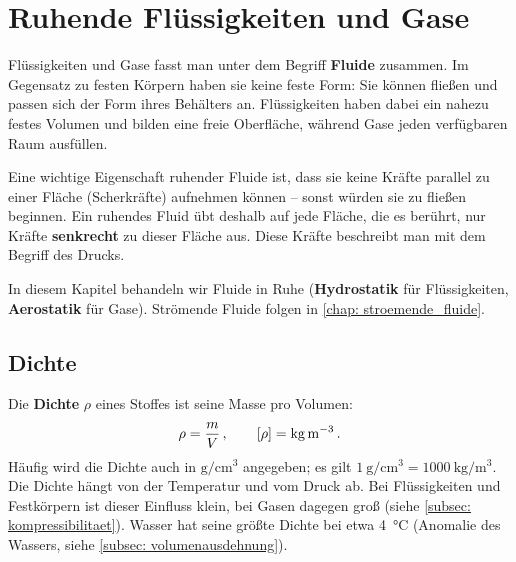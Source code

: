 \chapter{Ruhende Flüssigkeiten und Gase}\label{chap: ruhende_fluide}
Flüssigkeiten und Gase fasst man unter dem Begriff \textbf{Fluide} zusammen. Im Gegensatz zu festen Körpern haben sie keine feste Form: Sie können fließen und passen sich der Form ihres Behälters an. Flüssigkeiten haben dabei ein nahezu festes Volumen und bilden eine freie Oberfläche, während Gase jeden verfügbaren Raum ausfüllen.

Eine wichtige Eigenschaft ruhender Fluide ist, dass sie keine Kräfte parallel zu einer Fläche (Scherkräfte) aufnehmen können -- sonst würden sie zu fließen beginnen. Ein ruhendes Fluid übt deshalb auf jede Fläche, die es berührt, nur Kräfte \textbf{senkrecht} zu dieser Fläche aus. Diese Kräfte beschreibt man mit dem Begriff des Drucks.

In diesem Kapitel behandeln wir Fluide in Ruhe (\textbf{Hydrostatik} für Flüssigkeiten, \textbf{Aerostatik} für Gase). Strömende Fluide folgen in \cref{chap: stroemende_fluide}.

\section{Dichte}\label{sec: dichte}
Die \textbf{Dichte} $\rho$ eines Stoffes ist seine Masse pro Volumen:
\begin{equation}\label{eq: dichte}
    \rho = \frac{m}{V} \,{,}\, \qquad [\rho] = \si{\kilogram\per\meter\cubed} \,.
\end{equation}
Häufig wird die Dichte auch in $\si{\gram\per\centi\meter\cubed}$ angegeben; es gilt $\SI{1}{\gram\per\centi\meter\cubed} = \SI{1000}{\kilogram\per\meter\cubed}$. Die Dichte hängt von der Temperatur und vom Druck ab. Bei Flüssigkeiten und Festkörpern ist dieser Einfluss klein, bei Gasen dagegen groß (siehe \cref{subsec: kompressibilitaet}). Wasser hat seine größte Dichte bei etwa \SI{4}{\celsius} (Anomalie des Wassers, siehe \cref{subsec: volumenausdehnung}).

